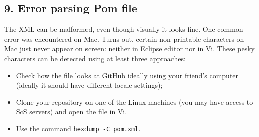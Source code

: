 \subsection{9. Error parsing Pom file}
The XML can be malformed, even though visually it looks fine.
One common error was encountered on Mac.
Turns out, certain non-printable characters on Mac just never appear on screen:
neither in Eclipse editor nor in Vi.
These pesky characters can be detected using at least three approaches:
\begin{itemize}
\item Check how the file looks at GitHub ideally using your friend's computer (ideally
it should have different locale settings);
\item Clone your repository on one of the Linux machines (you may have access to ScS servers)
and open the file in Vi.
\item Use the command \texttt{hexdump -C pom.xml}.
\end{itemize}

